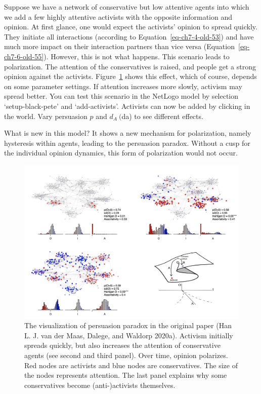 \documentclass[
  a4paper,
  DIV=11,
  numbers=noendperiod,
  oneside]{scrreprt}
\begin{document}
Suppose we have a network of conservative but low attentive agents into
which we add a few highly attentive activists with the opposite
information and opinion. At first glance, one would expect the
activists' opinion to spread quickly. They initiate all interactions
(according to Equation~\ref{eq-ch7-4-old-53}) and have much more impact
on their interaction partners than vice versa
(Equation~\ref{eq-ch7-6-old-55}). However, this is not what happens.
This scenario leads to polarization. The attention of the conservatives
is raised, and people get a strong opinion against the activists.
Figure~\ref{fig-ch7-img11-old-99} shows this effect, which of course,
depends on some parameter settings. If attention increases more slowly,
activism may spread better. You can test this scenario in the NetLogo
model by selection `setup-black-pete' and `add-activists'. Activists can
now be added by clicking in the world. Vary persuasion \(p\) and
\(d_{A}\ (\)da) to see different effects.

What is new in this model? It shows a new mechanism for polarization,
namely hysteresis within agents, leading to the persuasion paradox.
Without a cusp for the individual opinion dynamics, this form of
polarization would not occur.

\begin{figure}

{\centering \includegraphics{media/ch7/image11.jpg}

}

\caption{\label{fig-ch7-img11-old-99}The visualization of persuasion
paradox in the original paper (Han L. J. van der Maas, Dalege, and
Waldorp 2020a). Activism initially spreads quickly, but also increases
the attention of conservative agents (see second and third panel). Over
time, opinion polarizes. Red nodes are activists and blue nodes are
conservatives. The size of the nodes represents attention. The last
panel explains why some conservatives become (anti-)activists
themselves.}

\end{figure}
\end{document}
